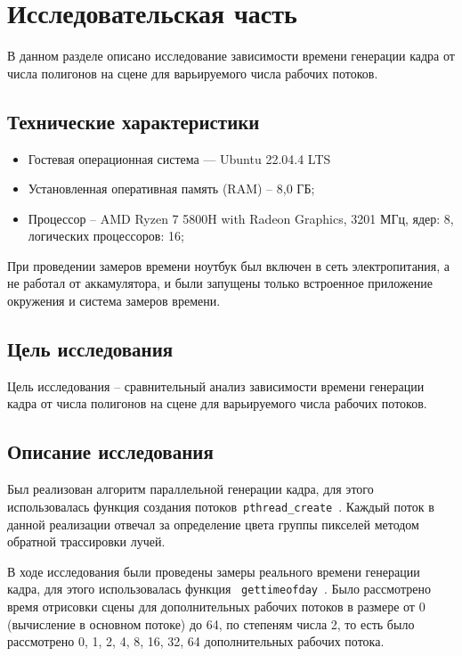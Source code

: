 \chapter{Исследовательская часть}

В данном разделе описано исследование зависимости времени генерации кадра от числа полигонов на сцене для варьируемого числа рабочих потоков.

\section{Технические характеристики}
\begin{itemize}
	\item {Гостевая операционная система --- Ubuntu 22.04.4 LTS}
	\item {Установленная оперативная память (RAM) -- 8,0 ГБ;}
	\item {Процессор -- AMD Ryzen 7 5800H with Radeon Graphics, 3201 МГц, ядер: 8, логических процессоров: 16;}
\end{itemize}

При проведении замеров времени ноутбук был включен в сеть электропитания, а не работал от аккамулятора, и были запущены только встроенное приложение окружения и система замеров времени.

\section{Цель исследования}
Цель исследования -- сравнительный анализ зависимости времени генерации кадра от числа полигонов на сцене для варьируемого числа рабочих потоков.

\section{Описание исследования}

Был реализован алгоритм параллельной генерации кадра, для этого использовалась функция создания потоков~\texttt{pthread\_create}~\cite{thread-city}. Каждый поток в данной реализации отвечал за определение цвета группы пикселей методом обратной трассировки лучей. 

В ходе исследования были проведены замеры реального времени генерации кадра, для этого использовалась функция ~\texttt{gettimeofday}~\cite{time-city}. Было рассмотрено время отрисовки сцены для дополнительных рабочих потоков в размере от 0 (вычисление в основном потоке) до 64, по степеням числа 2, то есть было рассмотрено 0, 1, 2, 4, 8, 16, 32, 64 дополнительных рабочих потока.

